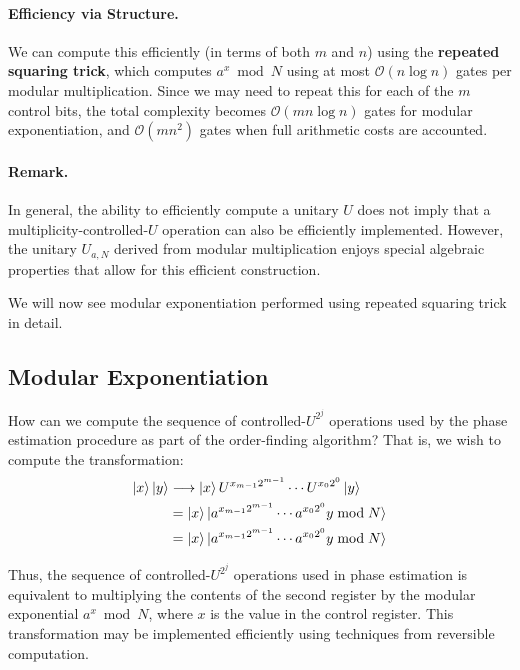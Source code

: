 \paragraph{Efficiency via Structure.} We can compute this efficiently (in terms of both $m$ and $n$) using the \textbf{repeated squaring trick}, which computes $a^x \bmod N$ using at most $\mathcal{O}(n \log n)$ gates per modular multiplication. Since we may need to repeat this for each of the $m$ control bits, the total complexity becomes $\mathcal{O}(mn \log n)$ gates for modular exponentiation, and $\mathcal{O}(mn^2)$ gates when full arithmetic costs are accounted.

\paragraph{Remark.} In general, the ability to efficiently compute a unitary $U$ does not imply that a multiplicity-controlled-$U$ operation can also be efficiently implemented. However, the unitary $U_{a,N}$ derived from modular multiplication enjoys special algebraic properties that allow for this efficient construction.

We will now see modular exponentiation performed using repeated squaring trick in detail.

\subsection*{Modular Exponentiation}

How can we compute the sequence of controlled-$U^{2^j}$ operations used by the phase estimation procedure as part of the order-finding algorithm? That is, we wish to compute the transformation:
\begin{align*}
    \ket{x}\ket{y} &\longrightarrow \ket{x} U^{x_{m-1} 2^{m-1}} \cdots U^{x_0 2^0} \ket{y} \\
    &= \ket{x} \ket{a^{x_{m-1} 2^{m-1}} \cdots a^{x_0 2^0} y \bmod N} \\
    &= \ket{x} \ket{a^{x_{m-1} 2^{m-1}} \cdots a^{x_0 2^0} y \bmod N}
\end{align*}

Thus, the sequence of controlled-$U^{2^j}$ operations used in phase estimation is equivalent to multiplying the contents of the second register by the modular exponential $a^x \bmod N$, where $x$ is the value in the control register. This transformation may be implemented efficiently using techniques from reversible computation.

